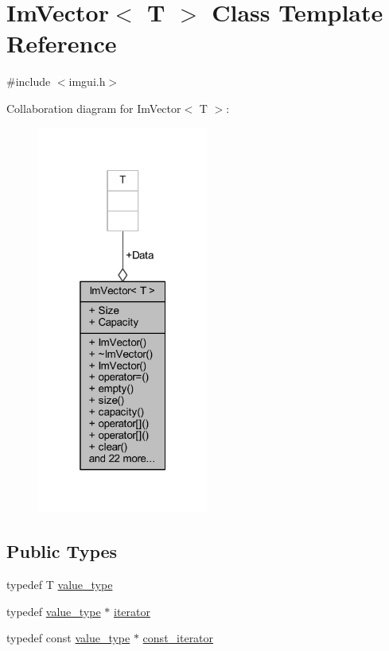 \hypertarget{class_im_vector}{}\section{Im\+Vector$<$ T $>$ Class Template Reference}
\label{class_im_vector}


{\ttfamily \#include $<$imgui.\+h$>$}



Collaboration diagram for Im\+Vector$<$ T $>$\+:
\nopagebreak
\begin{figure}[H]
\begin{center}
\leavevmode
\includegraphics[width=160pt]{class_im_vector__coll__graph}
\end{center}
\end{figure}
\subsection*{Public Types}
\begin{DoxyCompactItemize}
\item 
typedef T \mbox{\hyperlink{class_im_vector_a8bd77e4e7581d8e5f9e98d7c2f3c2a80}{value\+\_\+type}}
\item 
typedef \mbox{\hyperlink{class_im_vector_a8bd77e4e7581d8e5f9e98d7c2f3c2a80}{value\+\_\+type}} $\ast$ \mbox{\hyperlink{class_im_vector_a74b5478f1f6fd471cc71219bce483db6}{iterator}}
\item 
typedef const \mbox{\hyperlink{class_im_vector_a8bd77e4e7581d8e5f9e98d7c2f3c2a80}{value\+\_\+type}} $\ast$ \mbox{\hyperlink{class_im_vector_aedeac9c5080f9d6ce96ae837768ee4c4}{const\+\_\+iterator}}
\end{DoxyCompactItemize}
